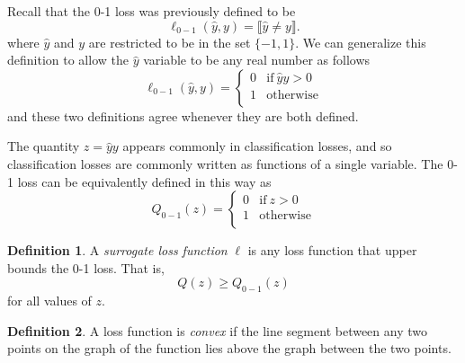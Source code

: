 \documentclass[10pt]{exam}
\theoremstyle{definition}
\newtheorem{defn}{Definition}
\DeclareMathOperator{\sign}{sign}
\begin{document}
Recall that the 0-1 loss was previously defined to be
\begin{equation}
    \ell_{0-1}(\hat y, y) = \llbracket \hat y \ne y \rrbracket
    .
\end{equation}
where $\hat y$ and $y$ are restricted to be in the set $\{-1, 1\}$.
We can generalize this definition to allow the $\hat y$ variable to be any real number as follows
\begin{equation}
    \ell_{0-1}(\hat y, y)
    =
    \begin{cases}
        0 & \text{if}~\hat y y > 0 \\
        1 & \text{otherwise} \\
    \end{cases}
\end{equation}
and these two definitions agree whenever they are both defined.

\vspace{1in}
The quantity $z = \hat y y$ appears commonly in classification losses, and so classification losses are commonly written as functions of a single variable.
The 0-1 loss can be equivalently defined in this way as
\begin{equation}
    Q_{0-1}(z)
    =
    \begin{cases}
        0 & \text{if}~z > 0 \\
        1 & \text{otherwise} \\
    \end{cases}
\end{equation}

\newpage
\begin{defn}
    A \emph{surrogate loss function} $\ell$ is any loss function that upper bounds the 0-1 loss.
    That is,
    \begin{equation}
        Q(z) \ge Q_{0-1}(z)
    \end{equation}
    for all values of $z$.
\end{defn}

\begin{defn}
    A loss function is \emph{convex} if the line segment between any two points on the graph of the function lies above the graph between the two points.
\end{defn}
\end{document}
